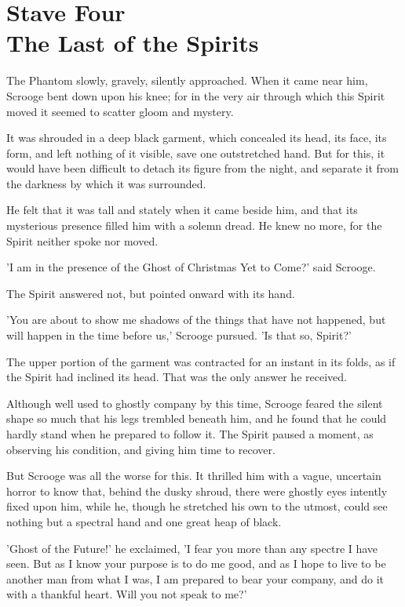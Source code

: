 \chapter{Stave Four\\The Last of the Spirits}

The Phantom slowly, gravely, silently approached. When it came near him,
Scrooge bent down upon his knee; for in the very air through which this
Spirit moved it seemed to scatter gloom and mystery.

It was shrouded in a deep black garment, which concealed its head, its
face, its form, and left nothing of it visible, save one outstretched
hand. But for this, it would have been difficult to detach its figure
from the night, and separate it from the darkness by which it was
surrounded.

He felt that it was tall and stately when it came beside him, and that
its mysterious presence filled him with a solemn dread. He knew no more,
for the Spirit neither spoke nor moved.

'I am in the presence of the Ghost of Christmas Yet to Come?' said
Scrooge.

The Spirit answered not, but pointed onward with its hand.

'You are about to show me shadows of the things that have not happened,
but will happen in the time before us,' Scrooge pursued. 'Is that so,
Spirit?'

The upper portion of the garment was contracted for an instant in its
folds, as if the Spirit had inclined its head. That was the only answer
he received.

Although well used to ghostly company by this time, Scrooge feared the
silent shape so much that his legs trembled beneath him, and he found
that he could hardly stand when he prepared to follow it. The Spirit
paused a moment, as observing his condition, and giving him time to
recover.

But Scrooge was all the worse for this. It thrilled him with a vague,
uncertain horror to know that, behind the dusky shroud, there were
ghostly eyes intently fixed upon him, while he, though he stretched his
own to the utmost, could see nothing but a spectral hand and one great
heap of black.

'Ghost of the Future!' he exclaimed, 'I fear you more than any spectre
I have seen. But as I know your purpose is to do me good, and as I hope
to live to be another man from what I was, I am prepared to bear your
company, and do it with a thankful heart. Will you not speak to me?'

